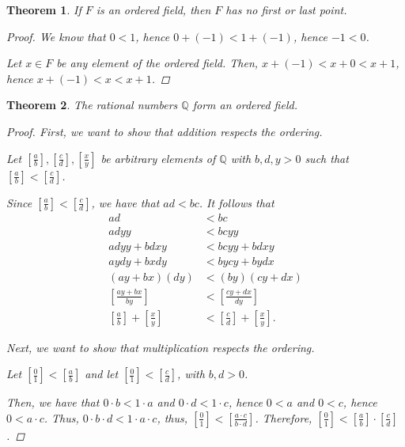 \documentclass[11pt]{article}
\newcommand{\bbQ}{\mathbb{Q}}
\newtheorem{theorem}{Theorem}[section]
\theoremstyle{definition}
\numberwithin{equation}{subsection}
\begin{document}
\begin{theorem}
	If $F$ is an ordered field, then $F$ has no first or last point.  
        
\begin{proof}
We know that $0<1$, hence $0+(-1)<1+(-1)$, hence $-1<0$. 

Let $x \in F$ be any element of the ordered field. Then, $x+(-1)<x+0<x+1$, hence $x+(-1)<x<x+1$.

\renewcommand\qedsymbol{QED}
\end{proof}


\end{theorem}

\begin{theorem}
	
	The rational numbers $\bbQ$ form an ordered field.
\begin{proof}
First, we want to show that addition respects the ordering.

Let $[\frac{a}{b}],[\frac{c}{d}],[\frac{x}{y}]$ be arbitrary elements of $\bbQ$ with $b,d,y>0$ such that $[\frac{a}{b}]<[\frac{c}{d}]$. 

Since $[\frac{a}{b}]<[\frac{c}{d}]$, we have that $ad<bc$. It follows that
        \begin{align*}
            ad &< bc\\
            adyy &< bcyy\\
            adyy+bdxy &< bcyy+bdxy\\
            aydy+bxdy &< bycy+bydx\\
            (ay+bx)(dy) &< (by)(cy+dx)\\
            [\frac{ay+bx}{by}] &< [\frac{cy+dx}{dy}]\\
            [\frac{a}{b}]+[\frac{x}{y}] &< [\frac{c}{d}] + [\frac{x}{y}].
        \end{align*}

Next, we want to show that multiplication respects the ordering.

Let $[\frac{0}{1}]<[\frac{a}{b}]$ and let $[\frac{0}{1}]< [\frac{c}{d}]$, with $b,d>0$.

Then, we have that $0\cdot b<1\cdot a$ and $0\cdot d<1\cdot c$, hence $0<a$ and $0<c$, hence $0<a\cdot c$. Thus, $0\cdot b\cdot d<1 \cdot a \cdot c$, thus, $[\frac{0}{1}]<[\frac{a\cdot c}{b \cdot d}]$. Therefore, $[\frac{0}{1}]<[\frac{a}{b}] \cdot [\frac{c}{d}]$.


\renewcommand\qedsymbol{QED}
\end{proof}
    
\end{theorem}
\end{document}
